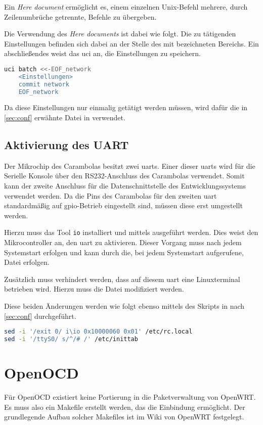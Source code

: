 \begin{definition}
Ein \emph{Here document} ermöglicht es, einem einzelnen Unix-Befehl mehrere,
durch Zeilenumbrüche getrennte, Befehle zu übergeben.
\end{definition}
Die Verwendung des \emph{Here documents} ist dabei wie folgt. Die zu tätigenden
Einstellungen befinden sich dabei an der Stelle des mit
 bezeichneten Bereichs. Ein abschließendes
 weist das \gls{uci} an, die Einstellungen zu
speichern.
 \begin{lstlisting}[language=sh]
uci batch <<-EOF_network
	<Einstellungen>
	commit network
	EOF_network
\end{lstlisting}
Da diese Einstellungen nur einmalig getätigt werden müssen, wird dafür die in
\autoref{sec:conf} erwähnte Datei in  verwendet.

\subsection{Aktivierung des UART}\label{subs:aktuart}
Der Mikrochip\cite{RA01} des Carambolas besitzt zwei \glspl{uart}. Einer dieser
\glspl{uart} wird für die Serielle Konsole über den RS232-Anschluss des
Carambolas verwendet. Somit kann der zweite Anschluss für die
Datenschnittstelle des Entwicklungssystems verwendet werden.
Da die Pins des Carambolas für den zweiten \gls{uart} standardmäßig auf
\gls{gpio}-Betrieb eingestellt sind, müssen diese erst umgestellt werden.

Hierzu muss das Tool \texttt{io} installiert und mittels 
 ausgeführt werden. Dies weist den
Mikrocontroller an, den \gls{uart} zu aktivieren. Dieser Vorgang muss nach jedem
Systemstart erfolgen und kann durch die, bei jedem Systemstart aufgerufene,
Datei  erfolgen.

Zusätzlich muss verhindert werden, dass auf diesem \gls{uart} eine Linuxterminal
betrieben wird. Hierzu muss die Datei  modifiziert
werden.

Diese beiden Änderungen werden wie folgt ebenso mittels des Skripts in
 nach \autoref{sec:conf} durchgeführt.
\begin{lstlisting}[language=sh]
sed -i '/exit 0/ i\io 0x10000060 0x01' /etc/rc.local
sed -i '/ttyS0/ s/^/# /' /etc/inittab
\end{lstlisting}

\section{OpenOCD}
Für OpenOCD existiert keine Portierung in die Paketverwaltung von OpenWRT. Es
muss also ein Makefile erstellt werden, das die Einbindung ermöglicht. Der
grundlegende Aufbau solcher Makefiles ist im Wiki von OpenWRT
festgelegt\cite{OWRT}.
